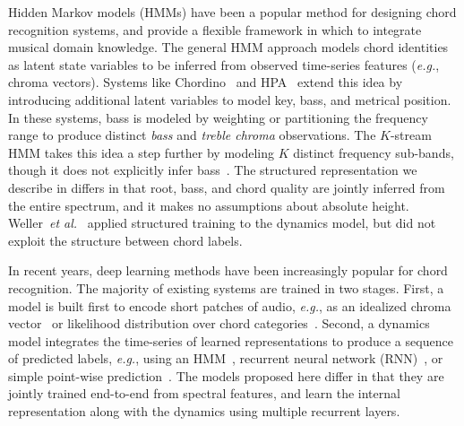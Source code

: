 \documentclass{article}
\def\eg{\emph{e.g.}}
\def\etal{\emph{et al.}}
\begin{document}
Hidden Markov models (HMMs) have been a popular method for designing chord recognition systems, and provide a flexible framework in which to integrate musical domain knowledge.
The general HMM approach models chord identities as latent state variables to be inferred from observed time-series features (\eg, chroma vectors).
Systems like Chordino~\cite{matthias2010a} and HPA~\cite{ni2012end} extend this idea by introducing additional latent variables to model key, bass, and metrical position.
In these systems, bass is modeled by weighting or partitioning the frequency range to produce distinct \emph{bass} and \emph{treble chroma} observations.
The $K$-stream HMM takes this idea a step further by modeling $K$ distinct frequency sub-bands, though it does not explicitly infer bass~\cite{cho2014improved}.
The structured representation we describe in  differs in that root, bass, and chord quality are jointly inferred from the entire spectrum, and it makes no assumptions about absolute height.
Weller~\etal~\cite{weller2009structured} applied structured training to the dynamics model, but did not exploit the structure between chord labels.



%   

In recent years, deep learning methods have been increasingly popular for chord recognition.
The majority of existing systems are trained in two stages. 
First, a model is built first to encode short patches of audio, \eg, as an idealized chroma vector~\cite{boulanger2013audio,korzeniowski2016feature} or likelihood distribution over chord categories~\cite{humphrey2015four,sigtia2015audio,zhou2015chord,deng2016hybrid}.
Second, a dynamics model integrates the time-series of learned representations to produce a sequence of predicted labels, \eg, using an HMM~\cite{humphrey2015four,zhou2015chord}, recurrent neural network (RNN)~\cite{boulanger2013audio,sigtia2015audio}, or simple point-wise prediction~\cite{korzeniowski2016feature}.
The models proposed here differ in that they are jointly trained end-to-end from spectral features, and learn the internal representation along with the dynamics using multiple recurrent layers.
\end{document}
